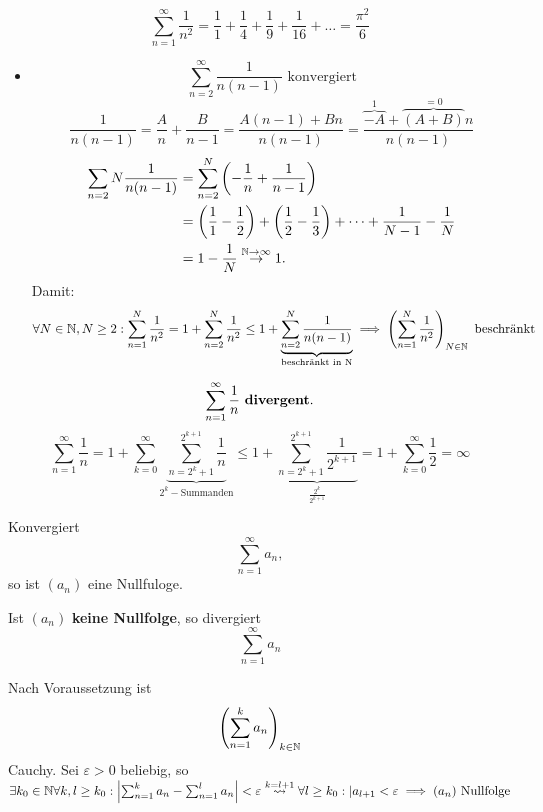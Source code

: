 \documentclass[consecutivenumbering]{gadsescript}
\begin{document}
\begin{subexample}
	\[ \sum_{n=1}^{\infty} \frac{1}{n^2} = \frac{1}{1} + \frac{1}{4} + \frac{1}{9} + \frac{1}{16} + \dotsc = \frac{\pi^2}{6} \]
	\begin{itemize}
		\item \[ \sum_{n=2}^{\infty} \frac{1}{n(n-1)} \text{ konvergiert}\]
			\[ \frac{1}{n(n-1)} = \frac{A}{n} + \frac{B}{n-1} = \frac{A(n-1) + Bn}{n(n-1)} = \frac{\overbrace{-A}^{1} + \overbrace{(A+B)}^{=0}n}{n(n-1)} \]
			\begin{align*}
				\sum_{n=2}{N} \frac{1}{n(n-1)} &= \sum_{n=2}^{N} \left( - \frac{1}{n} + \frac{1}{n-1} \right)\\
				~&= \left( \frac{1}{1} - \frac{1}{2} \right) + \left( \frac{1}{2} - \frac{1}{3} \right) + \dotsb + \frac{1}{N-1} - \frac{1}{N}\\
				~&= 1 - \frac{1}{N} \overset{\mathbb{N}\to\infty}{\to} 1.
			\end{align*}
			Damit:
			\[ \forall N \in \mathbb{N}, N \geq 2: \sum_{n=1}^{N} \frac{1}{n^2} = 1 + \sum_{n=2}^{N} \frac{1}{n^2} \leq 1 + \underbrace{\sum_{n=2}^{N} \frac{1}{n(n-1)}}_{\text{beschränkt in N}} \implies \left(\sum_{n=1}^{N} \frac{1}{n^2} \right)_{N\in\mathbb{N}} \text{ beschränkt} \]
	\end{itemize}
\end{subexample}
\begin{subexample}
	\[ \sum_{n=1}^{\infty} \frac{1}{n} \text{ \textbf{divergent}}.\]
	\[ \sum_{n=1}^{\infty} \frac{1}{n} = 1 + \sum_{k=0}^{\infty} \underbrace{\sum_{n=2^{k} + 1}^{2^{k+1}} \frac{1}{n}}_{2^k-\text{Summanden}} \leq 1 + \underbrace{\sum_{n=2^{k} + 1}^{2^{k+1}} \frac{1}{2^{k+1}}}_{\frac{2^k}{2^{k+1}}} = 1 + \sum_{k=0}^{\infty}\frac{1}{2} = \infty \]
\end{subexample}

\begin{sublemma}
	Konvergiert
	\[ \sum_{n=1}^{\infty} a_n, \]
	so ist $ (a_n) $ eine Nullfuloge.
\end{sublemma}
\begin{subcorollary}
	Ist $(a_n)$ \textbf{keine Nullfolge}, so divergiert
	\[ \sum_{n=1}^{\infty} a_n \]
\end{subcorollary}

\begin{subproof*}
	Nach Voraussetzung ist
	\[ \left( \sum_{n=1}^{k} a_n \right)_{k\in\mathbb{N}} \]
	Cauchy.
	Sei $ \varepsilon > 0 $ beliebig, so $ \exists k_0 \in \mathbb{N} \forall k, l \geq k_0 : \left| \sum_{n=1}^{k} a_n - \sum_{n=1}^{l}a_n \right| < \varepsilon \overset{k = l+1}{\rightsquigarrow} \forall l \geq k_0 : | a_{l+1} < \varepsilon \implies (a_n) \text{ Nullfolge} $
\end{subproof*}
\end{document}
